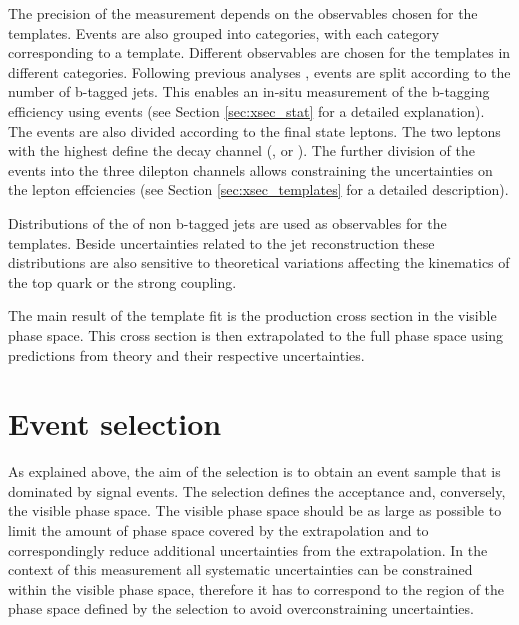The precision of the measurement depends on the observables chosen for the templates. Events are also grouped into categories, with each category corresponding to a template. Different observables are chosen for the templates in different categories.
Following previous analyses \cite{Khachatryan:2016mqs}, events are split according to the number of b-tagged jets. This enables an in-situ measurement of the b-tagging efficiency using \ttbar events (see Section \ref{sec:xsec_stat} for a detailed explanation).
The events are also divided according to the final state leptons. The two leptons with the highest \pt define the decay channel (\emu, \mumu or \ee). The further division of the events into the three dilepton channels
allows constraining the uncertainties on the lepton effciencies (see Section \ref{sec:xsec_templates} for a detailed description).

Distributions of the \pt of non b-tagged jets are used as observables for the templates. Beside uncertainties related to the jet reconstruction these distributions are also sensitive to theoretical variations affecting the kinematics of the top quark or the strong coupling.

The main result of the template fit is the \ttbar production cross section in the visible phase space. This cross section is then extrapolated to the full phase space using predictions from theory and their
respective uncertainties.

\section{Event selection}
\label{sec:xsec_sel}

As explained above, the aim of the selection is to obtain an event sample that is dominated by signal events. The selection defines the acceptance and, conversely, the visible phase space. 
The visible phase space should be as large as possible to limit the amount of phase space covered by the extrapolation and to correspondingly reduce additional uncertainties from the extrapolation. 
In the context of this measurement all systematic uncertainties can be constrained within the visible phase space, therefore it has to correspond to the region of the phase space defined by the selection to avoid overconstraining
uncertainties. 

